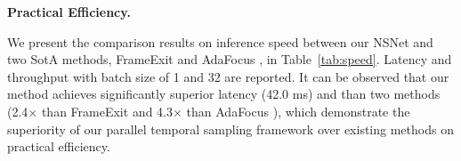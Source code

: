\documentclass[runningheads]{llncs}
\newcommand{\tabref}[1]{Table~\ref{#1}}
\begin{document}
\noindent\textbf{Practical Efficiency.}
\begin{table}[t]
\setlength{\tabcolsep}{4pt}
\renewcommand{\arraystretch}{0.9}
\caption{Comparison of practical efficiency between SotA methods. }\label{tab:speed}
\end{table} We present the comparison results on inference speed between our NSNet and two SotA methods, FrameExit \cite{frameexit} and AdaFocus \cite{adafocus}, in \tabref{tab:speed}.  Latency and throughput with batch size of 1 and 32 are reported\footnotemark[1]. 
It can be observed that our method achieves significantly superior latency (42.0 ms) and than two methods (2.4$\times$ than FrameExit \cite{frameexit} and 4.3$\times$ than AdaFocus \cite{adafocus}), which demonstrate the superiority of our parallel temporal sampling framework over existing methods on practical efficiency.
\end{document}
